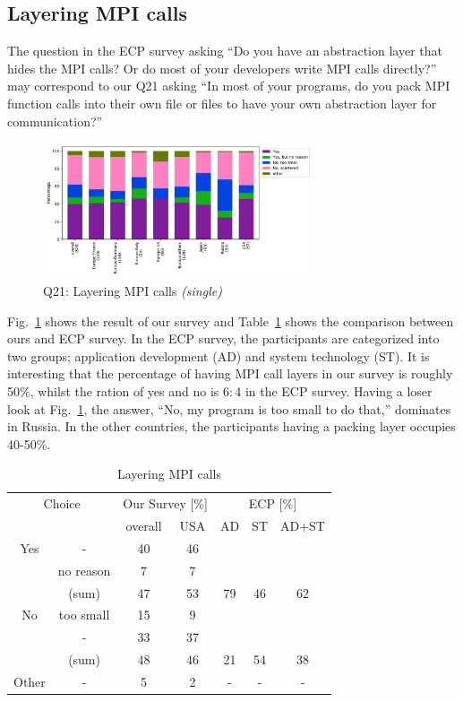 \documentclass[conference,10pt,letterpaper]{IEEEtran}
\begin{document}
\subsection{Layering MPI calls}

The question in the ECP survey asking ``Do you have an abstraction
layer that hides the MPI calls? Or do most of your developers write
MPI calls directly?'' may correspond to our Q21 asking ``In most of
your programs, do you pack MPI function calls into their own file or
files to have your own abstraction layer for communication?'' 

\begin{figure}[htb]
\begin{center}
\includegraphics[width=8cm]{Figs/Q21.pdf}
\caption{Q21: Layering MPI calls {\it(single)}}
\label{fig:layering-mpi-calls}
\end{center}
\end{figure}

Fig.~\ref{fig:layering-mpi-calls} shows the result of our survey and
Table~\ref{tab:layering-mpi-calls} shows the comparison between ours
and ECP survey. In the ECP survey, the participants are categorized
into two groups; application development (AD) and system technology
(ST). It is interesting that the percentage of having MPI call layers
in our survey is roughly 50\%, whilst the ration of yes and no is
$6:4$ in the ECP survey.
Having a loser look at Fig.~\ref{fig:layering-mpi-calls}, the answer,
 ``No, my program is too small to do that,'' dominates in Russia. In
the other countries, the participants having a packing layer occupies
40-50\%. 

\begin{table}[htb]%
\begin{center}%
\caption{Layering MPI calls}\label{tab:layering-mpi-calls}%
\begin{tabular}{c|c||c|c||c|c|c}%
\hline%
\multicolumn{2}{c||}{Choice} & \multicolumn{2}{c||}{Our Survey [\%]} &
\multicolumn{3}{c}{ECP [\%]} \\
\cline{3-7}%
\multicolumn{2}{c||}{} & overall & USA & AD & ST & AD+ST \\
\hline%
\hline%
Yes & - & 40 & 46 & & & \\
& no reason & 7 & 7 & & & \\
\cline{2-4}%
 & (sum) & 47 & 53 &  79 & 46 & 62 \\
\hline%
\hline%
No & too small & 15 & 9 & & & \\
& - & 33 & 37 & & & \\
\cline{2-4}%
 & (sum) & 48 & 46 & 21 & 54 & 38 \\
\hline%
Other & - & 5 & 2 & - & - & - \\
\hline%
\end{tabular}%
\end{center}%
\end{table}%
\end{document}

